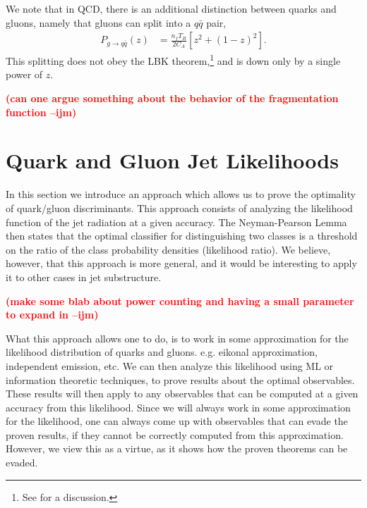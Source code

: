 \documentclass[letterpaper,11pt]{article}
\newcommand{\ijm}[1]{\marginpar{\raggedright\scriptsize\textbf{\textcolor{red}{ijm}}}  \textbf{\textcolor{red}{(#1 --ijm)}}}
\begin{document}
We note that in QCD, there is an additional distinction between quarks and gluons, namely that gluons can split into a $q\bar q$ pair,
\begin{align}
P_{g\to q\bar q}(z) & = \frac{n_f T_R}{2C_A}[z^2 + (1-z)^2].
\end{align}
This splitting does not obey the LBK theorem,\footnote{See \cite{Moult:2016fqy,Boughezal:2016zws,Moult:2017jsg,Boughezal:2018mvf,Moult:2018jjd} for a discussion.} and is down only by a single power of $z$.


\ijm{can one argue something about the behavior of the fragmentation function}









\section{Quark and Gluon Jet Likelihoods}
\label{sec:squirrel}

In this section we introduce an approach which allows us to prove the optimality of quark/gluon discriminants. This approach consists of analyzing the likelihood function of the jet radiation at a given accuracy. The Neyman-Pearson Lemma~\cite{neyman1933ix} then states that the optimal classifier for distinguishing two classes is a threshold on the ratio of the class probability densities (likelihood ratio).  We believe, however, that this approach is more general, and it would be interesting to apply it to other cases in jet substructure.

\ijm{make some blab about power counting and having a small parameter to expand in}\cite{Larkoski:2014gra}\cite{Moult:2016cvt}\cite{Larkoski:2014zma}


What this approach allows one to do, is to work in some approximation for the likelihood distribution of quarks and gluons. e.g. eikonal approximation, independent emission, etc. We can then analyze this likelihood using ML or information theoretic techniques, to prove results about the optimal observables. These results will then apply to any observables that can be computed at a given accuracy from this likelihood. Since we will always work in some approximation for the likelihood, one can always come up with observables that can evade the proven results, if they cannot be correctly computed from this approximation. However, we view this as a virtue, as it shows how the proven theorems can be evaded.
\end{document}
